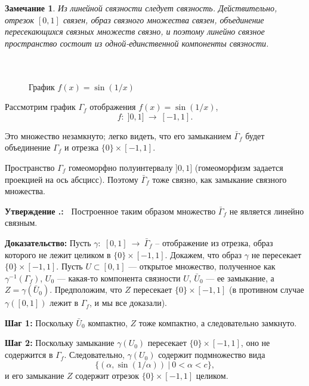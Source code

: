 \documentclass[12pt]{book}
\newcommand{\arrow}{{\:\longrightarrow\:}}
\theoremstyle{upshape}
\newtheorem{zadacha}{Задача}[chapter]
\theoremstyle{generic}
\newtheorem{remark}[teorema]{Замечание}
\def\замечание{\begin{remark}}
\def\еза{\end{remark}}
\theoremstyle{upshapenonumber}
\newtheorem{ukazanie}{Указание}[section]
\newcommand{\следствие}{%
     \refstepcounter{teorema}
     {\noindent\bf Следствие \thechapter.\arabic{teorema}:\ }}
\newcommand{\пример}{%
     \refstepcounter{teorema}
     {\noindent\bf Пример \thechapter.\arabic{teorema}:\ }}
\newcommand{\лемма}{%
     \refstepcounter{teorema}
     {\noindent\bf Лемма \thechapter.\arabic{teorema}:\ }}
\newcommand{\теорема}{%
     \refstepcounter{teorema}
     {\noindent\bf Теорема \thechapter.\arabic{teorema}:\ }}
\newcommand{\утверждение}{%
     \refstepcounter{teorema}
     {\noindent\bf Утверждение \thechapter.\arabic{teorema}:\ }}
\def\хфилл{\hfill}
\def\ноиндент{\noindent}
\def\бф{\bf}
\def\ем{\em}
\def\задача{\begin{zadacha}}
\def\ез{\end{zadacha}}
\def\указание{\begin{ukazanie}}
\def\еу{\end{ukazanie}}
\def\ео{\end{opredelenie}}
\def\енум{\begin{enumerate}}
\def\ее{\end{enumerate}}
\begin{document}
\замечание
Из линейной связности следует связность.
Действительно, отрезок $[0,1]$ связен,
образ связного множества связен, объединение
пересекающихся связных множеств связно,
и поэтому линейно связное пространство
состоит из одной-единственной компоненты связности.
\еза

\begin{figure}[ht]
\begin{center}\ \\
\\
{\small  График $f(x)= \sin(1/x)$}
\end{center}
\end{figure}

Рассмотрим график $\Gamma_f$ отображения $f(x)= \sin(1/x)$,
\[ f:\; ]0, 1]\arrow [-1,1].\]


Это множество незамкнуто; легко видеть, что его замыканием
$\bar\Gamma_f$ будет объединение $\Gamma_f$ и отрезка 
$\{0\}\times [-1,1]$.

Пространство $\Gamma_f$ гомеоморфно полуинтервалу $]0, 1]$
(гомеоморфизм задается проекцией на ось абсцисс).
Поэтому $\bar\Gamma_f$ тоже связно, как замыкание
связного множества.

\хфилл

\утверждение
Построенное таким образом множество
 $\bar\Gamma_f$ не является линейно связным.


\хфилл

\ноиндент
{\бф Доказательство:}
Пусть $\gamma:\; [0,1] \arrow \bar\Gamma_f$ --
отображение из отрезка, образ которого не лежит
целиком в $\{0\}\times [-1,1]$. Докажем, что
образ $\gamma$ не пересекает $\{0\}\times [-1,1]$.
Пусть $U \subset [0,1]$ --- открытое множество,
полученное как $\gamma^{-1}(\Gamma_f)$,
$U_0$ --- какая-то компонента связности $U$,
$\bar U_0$ --- ее замыкание, 
а $Z= \gamma(\bar U_0)$. Предположим,
что $Z$ пересекает $\{0\}\times [-1,1]$
(в противном случае $\gamma([0,1])$ лежит
в $\Gamma_f$, и мы все доказали).

\хфилл


\ноиндент
{\бф Шаг 1:} Поскольку $\bar U_0$ компактно,
$Z$ тоже компактно, а следовательно замкнуто.

\хфилл

\ноиндент
{\бф Шаг 2:}
Поскольку замыкание $\gamma(U_0)$ пересекает
$\{0\}\times [-1,1]$, оно не содержится
в $\Gamma_f$. Следовательно, $\gamma(U_0)$
содержит подмножество вида 
\[
\{ (\alpha, \sin(1/\alpha)) \ | \  0< \alpha< c\},
\]
и его замыкание $Z$ содержит отрезок $\{0\}\times [-1,1]$ целиком.
\end{document}

